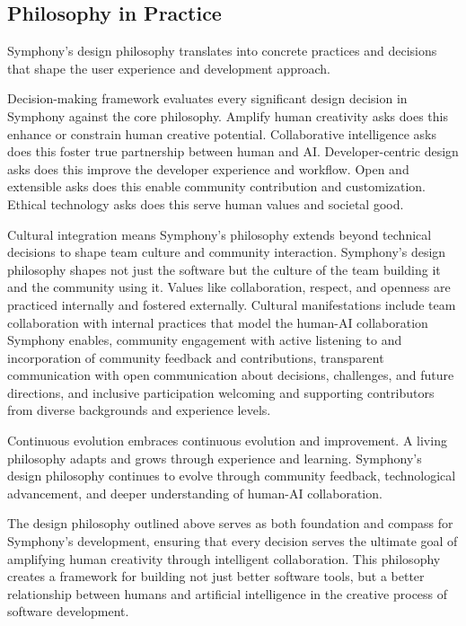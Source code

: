 \subsection{Philosophy in Practice}

Symphony's design philosophy translates into concrete practices and decisions that shape the user experience and development approach.

Decision-making framework evaluates every significant design decision in Symphony against the core philosophy. Amplify human creativity asks does this enhance or constrain human creative potential. Collaborative intelligence asks does this foster true partnership between human and AI. Developer-centric design asks does this improve the developer experience and workflow. Open and extensible asks does this enable community contribution and customization. Ethical technology asks does this serve human values and societal good.

Cultural integration means Symphony's philosophy extends beyond technical decisions to shape team culture and community interaction. Symphony's design philosophy shapes not just the software but the culture of the team building it and the community using it. Values like collaboration, respect, and openness are practiced internally and fostered externally. Cultural manifestations include team collaboration with internal practices that model the human-AI collaboration Symphony enables, community engagement with active listening to and incorporation of community feedback and contributions, transparent communication with open communication about decisions, challenges, and future directions, and inclusive participation welcoming and supporting contributors from diverse backgrounds and experience levels.

Continuous evolution embraces continuous evolution and improvement. A living philosophy adapts and grows through experience and learning. Symphony's design philosophy continues to evolve through community feedback, technological advancement, and deeper understanding of human-AI collaboration.

The design philosophy outlined above serves as both foundation and compass for Symphony's development, ensuring that every decision serves the ultimate goal of amplifying human creativity through intelligent collaboration. This philosophy creates a framework for building not just better software tools, but a better relationship between humans and artificial intelligence in the creative process of software development.
